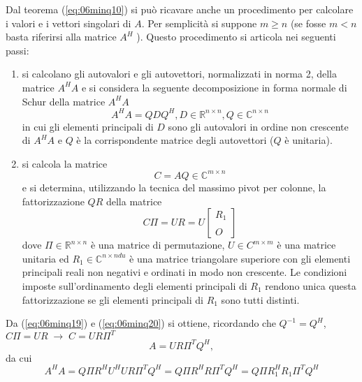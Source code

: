 Dal teorema (\ref{eq:06minq10}) 
si pu\`o ricavare anche un procedimento per calcolare
i valori e i vettori singolari di $A$. Per semplicit\`a si suppone
 $m \geq  n$ (se fosse  $m < n$ basta riferirsi alla matrice
 $A^H$ ). Questo procedimento si articola nei seguenti passi:
 \begin{enumerate}
 \item   si calcolano gli autovalori e gli autovettori,
 normalizzati in norma 2, della matrice $A^H A$ e si considera la
 seguente decomposizione in forma normale di Schur della matrice
$ A^H A$
\begin{equation}
  \label{eq:06minq18}
A^H A = QDQ^H , D \in \mathbb{R}^{n\times n} , Q \in 
\mathbb{C}^{n \times n}   
\end{equation}
in cui gli elementi principali di $D$ sono gli autovalori in 
ordine non crescente di $A^H A$ e $Q$ \`e la corrispondente 
matrice degli autovettori ($Q$ \`e unitaria).

\item
 si calcola la matrice
 \begin{equation}
   \label{eq:06minq19}
  C = AQ \in \mathbb{C}^{m \times n} 
 \end{equation}
e si determina, utilizzando la tecnica del massimo pivot 
per colonne, la fattorizzazione $QR$ della matrice
\begin{equation}
  \label{eq:06minq20}
  C\Pi  = UR = U 
\left[
\begin{array}{c}
R_1  \\
     \\
O
\end{array}
\right]
\end{equation}
dove $\Pi \in \mathbb{R}^{n \times n}$ \`e una matrice di
permutazione, $U \in C^{m \times m}$ \`e una matrice unitaria ed $R_1
\in \mathbb{C}^{n \times ndu}$ \`e una matrice triangolare superiore con
gli elementi principali reali non negativi e ordinati in modo non
crescente. Le condizioni imposte sull'ordinamento degli elementi
principali di $R_1$ rendono unica questa fattorizzazione se gli
elementi principali di $R_1$ sono tutti distinti.

 \end{enumerate}
Da (\ref{eq:06minq19}) e 
(\ref{eq:06minq20}) si ottiene,
ricordando che $Q^{-1} = Q^{H}$, $C\Pi = UR \;\rightarrow \; C = UR\Pi^{T}$
\begin{equation}
  \label{eq:06minq21}
A = U R\Pi^T Q^H ,
\end{equation}
da cui
$$A^H A = Q\Pi R^H U^H U R\Pi^T Q^H = Q\Pi R^H R\Pi^T Q^H =
 Q\Pi R_1^{H} R_1 \Pi^{T}Q^{H}$$

